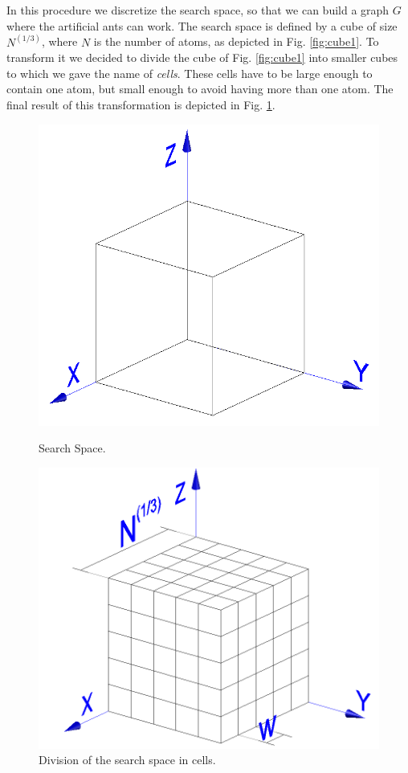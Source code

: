 	In this procedure we discretize the search space, so that we can build a graph $G$ where the artificial ants can work.
	The search space is defined by a cube of size $N^{(1/3)}$, where $N$ is the number of atoms, as depicted in Fig. \ref{fig:cube1}. To transform it we decided to divide the cube of Fig. \ref{fig:cube1} into smaller cubes to which we gave the name of \emph{cells}. These cells have to be large enough to contain one atom, but small enough to avoid having more than one atom. The final result of this transformation is depicted in Fig. \ref{fig:cube2}.
	
	\begin{figure}[t]
	\begin{minipage}[b]{0.5\linewidth}
	\centering
	\includegraphics[scale=0.25]{pictures/cube1}
	\caption{Search Space.}
	\label{fig:cube1}
	\end{minipage}
	\hspace{0.5cm}
	\begin{minipage}[b]{0.5\linewidth}
	\centering
	\includegraphics[scale=0.25]{pictures/cube2}
	\caption{Division of the search space in cells.}
	\label{fig:cube2}
	\end{minipage}
	\end{figure}  
